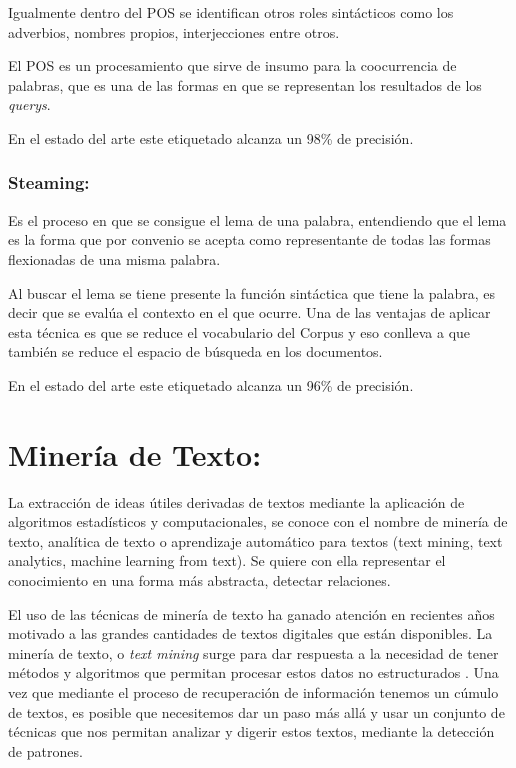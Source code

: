 \documentclass[
  10,
  openany]{book}
\begin{document}
Igualmente dentro del POS se identifican otros roles sintácticos como los adverbios, nombres propios, interjecciones entre otros.

El POS es un procesamiento que sirve de insumo para la coocurrencia de palabras, que es una de las formas en que se representan los resultados de los \emph{querys}.

En el estado del arte este etiquetado alcanza un 98\% de precisión.

\hypertarget{steaming}{%
\subsubsection{Steaming:}\label{steaming}}

Es el proceso en que se consigue el lema de una palabra, entendiendo que el lema es la forma que por convenio se acepta como representante de todas las formas flexionadas de una misma palabra.

Al buscar el lema se tiene presente la función sintáctica que tiene la palabra, es decir que se evalúa el contexto en el que ocurre. Una de las ventajas de aplicar esta técnica es que se reduce el vocabulario del Corpus y eso conlleva a que también se reduce el espacio de búsqueda en los documentos.

En el estado del arte este etiquetado alcanza un 96\% de precisión.

\hypertarget{textmin}{%
\section{Minería de Texto:}\label{textmin}}

La extracción de ideas útiles derivadas de textos mediante la aplicación de algoritmos estadísticos y computacionales, se conoce con el nombre de minería de texto, analítica de texto o aprendizaje automático para textos (text mining, text analytics, machine learning from text). Se quiere con ella representar el conocimiento en una forma más abstracta, detectar relaciones.

El uso de las técnicas de minería de texto ha ganado atención en recientes años motivado a las grandes cantidades de textos digitales que están disponibles. La minería de texto, o \emph{text mining} surge para dar respuesta a la necesidad de tener métodos y algoritmos que permitan procesar estos datos no estructurados \citep{miningt2012} . Una vez que mediante el proceso de recuperación de información tenemos un cúmulo de textos, es posible que necesitemos dar un paso más allá y usar un conjunto de técnicas que nos permitan analizar y digerir estos textos, mediante la detección de patrones.
\end{document}
